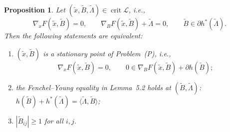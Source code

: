 \documentclass[11pt]{article}
\newtheorem{proposition}{Proposition}
\begin{document}
\begin{proposition}\label{prop:transfer}
Let $(\tilde x,\widetilde B,\widetilde\Lambda)\in\operatorname{crit}\mathcal{L}$,
i.e.,
\begin{equation}\label{eq:crit}
\nabla_xF(\tilde x,\widetilde B)=0,\qquad
\nabla_BF(\tilde x,\widetilde B)+\widetilde\Lambda=0,\qquad
\widetilde B\in\partial h^*(\widetilde\Lambda).
\end{equation}
Then the following statements are equivalent:
\begin{enumerate}[label=(\alph*)]
\item $(\tilde x,\widetilde B)$ is a stationary point of Problem~(P), i.e.,
\begin{equation}\label{eq:pstat}
\nabla_xF(\tilde x,\widetilde B)=0,\qquad
0\in\nabla_BF(\tilde x,\widetilde B)+\partial h(\widetilde B);
\end{equation}
\item the Fenchel--Young equality in Lemma~5.2 holds at
$(\widetilde B,\widetilde\Lambda)$:
$h(\widetilde B)+h^*(\widetilde\Lambda)=\langle\widetilde\Lambda,\widetilde B\rangle$;
\item $|\widetilde B_{ij}|\ge1$ for all $i,j$.
\end{enumerate}
\end{proposition}
\end{document}

